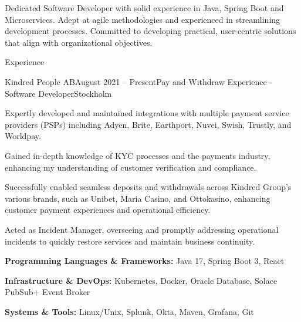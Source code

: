\documentclass{resume}
\begin{document}
  \noindent
  \linebreak
  Dedicated Software Developer with solid experience in Java, Spring Boot and Microservices. Adept at agile methodologies and experienced in streamlining development processes. Committed to developing practical, user-centric solutions that align with organizational objectives.

  \begin{rSection}{Experience}
    \begin{rSubsection}{Kindred People AB}{August 2021 -- Present}{Pay and Withdraw Experience - Software Developer}{Stockholm}
      \item Expertly developed and maintained integrations with multiple payment service providers (PSPs) including Adyen, Brite, Earthport, Nuvei, Swish, Trustly, and Worldpay.
      \item Gained in-depth knowledge of KYC processes and the payments industry, enhancing my understanding of customer verification and compliance.
      \item Successfully enabled seamless deposits and withdrawals across Kindred Group's various brands, such as Unibet, Maria Casino, and Ottokasino, enhancing customer payment experiences and operational efficiency.
      \item Acted as Incident Manager, overseeing and promptly addressing operational incidents to quickly restore services and maintain business continuity.
      \item \textbf{Programming Languages \& Frameworks:} Java 17, Spring Boot 3, React
      \item \textbf{Infrastructure \& DevOps:} Kubernetes, Docker, Oracle Database, Solace PubSub+ Event Broker
      \item \textbf{Systems \& Tools:} Linux/Unix, Splunk, Okta, Maven, Grafana, Git
    \end{rSubsection}


\end{rSection}
\end{document}
